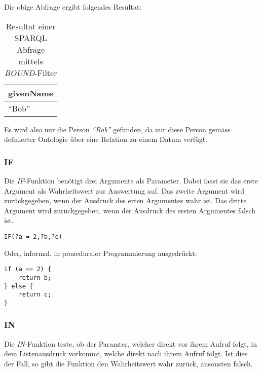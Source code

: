 Die obige Abfrage ergibt folgendes Resultat:
\noindent\hspace*{15mm}
\begin{table}[h]
    \centering
    \begin{tabular}{|l|}
        \hline
        \multicolumn{1}{|c|}{\textbf{givenName}} \\ \hline
        ``Bob''                    \\ \hline
    \end{tabular}
    \caption{Resultat einer SPARQL Abfrage mittels \textit{BOUND}-Filter\protect\footnotemark}
\end{table}

Es wird also nur die Person \textit{``Bob''} gefunden, da nur diese Person gemäss definierter Ontologie über eine Relation zu einem Datum verfügt.

\subsubsection{IF}
\label{subsec:sparql_ausdruecke_funktionen_if}
Die \textit{IF}-Funktion benötigt drei Argumente als Parameter. Dabei fasst sie das erste Argument als Wahrheitswert zur Auswertung auf. Das zweite Argument wird zurückgegeben, wenn der Ausdruck des erten Argumentes wahr ist. Das dritte Argument wird zurückgegeben, wenn der Ausdruck des ersten Argumentes falsch ist.

\begin{lstlisting}
IF(?a = 2,?b,?c)
\end{lstlisting}

Oder, informal, in prozeduraler Programmierung ausgedrückt:
\begin{lstlisting}
if (a == 2) {
    return b;
} else {
    return c;
}
\end{lstlisting}

\subsubsection{IN}
\label{subsec:sparql_ausdruecke_funktionen_in}
Die \textit{IN}-Funktion teste, ob der Paramter, welcher direkt vor ihrem Aufruf folgt, in dem Listenausdruck vorkommt, welche direkt nach ihrem Aufruf folgt. Ist dies der Fall, so gibt die Funktion den Wahrheitswert wahr zurück, ansonsten falsch.

